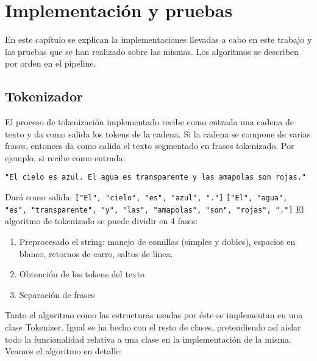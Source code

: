 \chapter{Implementación y pruebas}
\label{conclusion}

En este capítulo se explican la implementaciones llevadas a cabo en este trabajo y las pruebas que se han realizado sobre las mismas. Los algoritmos se describen por orden en el pipeline. 
\section{Tokenizador}
El proceso de tokenización implementado recibe como entrada una cadena de texto y da como salida los tokens de la cadena. Si la cadena se compone de varias frases, entonces da como salida el texto segmentado en frases tokenizado. Por ejemplo, si recibe como entrada: \newline
\begin{center}\texttt{"El cielo es azul. El agua es transparente y las amapolas son rojas."}
\end{center}
Dará como salida:
 \texttt{["El", "cielo", "es", "azul", "."]} \newline
\texttt{["El", "agua", "es", "transparente", "y", "las", "amapolas", "son", "rojas", "."]}\newline
El algoritmo de tokenizado se puede dividir en 4 fases:
\begin{enumerate}
\item Preprocesado el string: manejo de comillas (simples y dobles), espacios en blanco, retornos de carro, saltos de línea.
\item Obtención de los tokens del texto
\item Separación de frases
\end{enumerate}

Tanto el algoritmo como las estructuras usadas por éste se implementan en una clase \textcolor{SchoolColor}{Tokenizer}. Igual se ha hecho con el resto de clases, pretendiendo así aislar todo la funcionalidad relativa a una clase en la implementación de la misma. Veamos el algoritmo en detalle:

